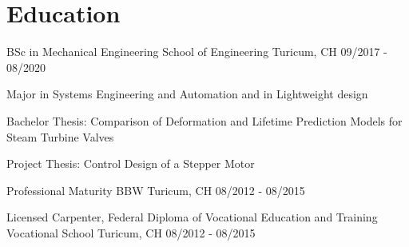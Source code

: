 \vspace{-\acvSectionTopSkip}
\section{Education}
\cventry
{BSc in Mechanical Engineering} %
{School of Engineering} %
{Turicum, CH} %
{09/2017 - 08/2020} %
\begin{cvitems}
\item {Major in Systems Engineering and Automation and in Lightweight design}
\item {Bachelor Thesis: Comparison of Deformation and Lifetime Prediction Models for Steam Turbine Valves}
\item {Project Thesis: Control Design of a Stepper Motor}
\end{cvitems}

\cventry
{Professional Maturity} %
{BBW} %
{Turicum, CH} %
{08/2012 - 08/2015} %

\cventry
{Licensed Carpenter, Federal Diploma of Vocational Education and Training} %
{Vocational School} %
{Turicum, CH} %
{08/2012 - 08/2015} %